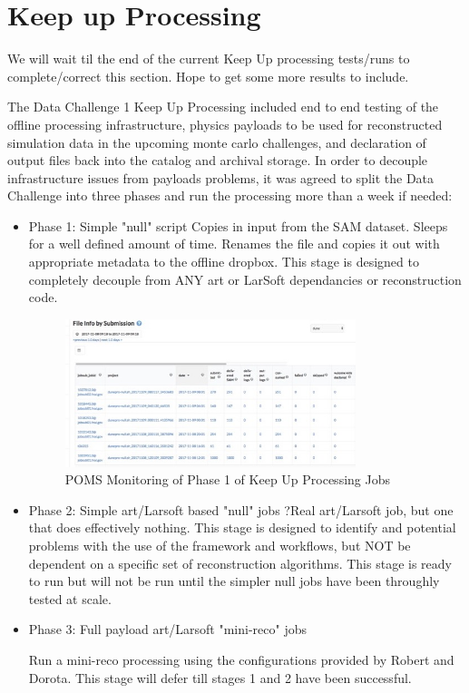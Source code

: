 \documentclass[pdftex,12pt,letter]{article}
\begin{document}
 

\section {Keep up Processing}

 \color{red} We will wait til the end of the current Keep Up processing tests/runs to complete/correct this section. Hope to get some more results to include.
 \color{black}

The Data Challenge 1 Keep Up Processing  included end to end testing of the offline processing infrastructure, physics payloads to be used for reconstructed simulation data in the upcoming monte carlo challenges, and declaration of output files back into the catalog and archival storage.  In order to decouple infrastructure issues from  payloads problems, it was agreed to split the Data Challenge into three phases and run the processing more than a week if needed:
\begin {itemize}

\item Phase 1: Simple "null" script
 Copies in input from the SAM dataset.  Sleeps for a well defined amount of time.  Renames the file and copies it out with appropriate metadata to the offline dropbox.
This stage is designed to completely decouple from ANY art or LarSoft dependancies or reconstruction code. 



\begin{figure}[tbh]
  \centering
  \includegraphics[width=0.8\textwidth]{./ReportImages/Phase1keepup.jpg}
  \caption{POMS Monitoring of Phase 1 of Keep Up Processing Jobs}
  \label{fig:keepupprocessingphase1}
\end{figure}


\item Phase 2: Simple art/Larsoft based "null" jobs
 ?Real art/Larsoft job, but one that does effectively nothing.  This stage is designed to identify and potential problems with the use of the framework and workflows, but NOT be dependent on a specific set of reconstruction algorithms.  
 This stage is ready to run but will not be run until the simpler null jobs have been throughly tested at scale.


\item Phase 3: Full payload art/Larsoft "mini-reco" jobs

 Run  a mini-reco processing using the configurations provided by Robert and Dorota. This stage will defer till stages 1 and 2 have been successful.

\end{itemize}
\end{document}
